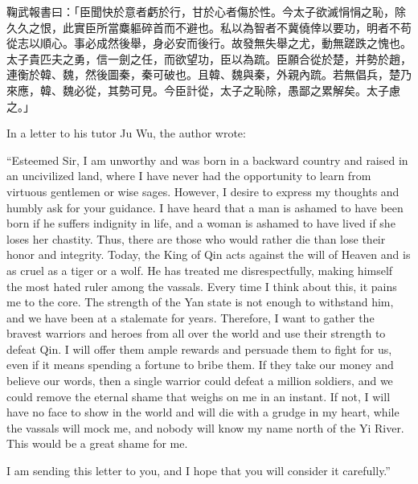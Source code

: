 \documentclass[12pt]{book}
\begin{document}
\Columns
\begin{pairs}
\begin{Rightside}
\begin{chinese}
\beginnumbering
\pstart
鞠武報書曰：「臣聞快於意者虧於行，甘於心者傷於性。今太子欲滅悁悁之恥，除久久之恨，此實臣所當麋軀碎首而不避也。私以為智者不冀僥倖以要功，明者不苟從志以順心。事必成然後舉，身必安而後行。故發無失舉之尤，動無蹉跌之愧也。太子貴匹夫之勇，信一劍之任，而欲望功，臣以為䟽。臣願合從於楚，并勢於趙，連衡於韓、魏，然後圖秦，秦可破也。且韓、魏與秦，外親內䟽。若無倡兵，楚乃來應，韓、魏必從，其勢可見。今臣計從，太子之恥除，愚鄙之累解矣。太子慮之。」
\pend
\endnumbering
\end{chinese}
\end{Rightside}
\begin{Leftside}
\begin{fioesjfsoeifj}
\beginnumbering
\pstart
In a letter to his tutor Ju Wu, the author wrote:

``Esteemed Sir, I am unworthy and was born in a backward country and raised in an uncivilized land, where I have never had the opportunity to learn from virtuous gentlemen or wise sages. However, I desire to express my thoughts and humbly ask for your guidance. I have heard that a man is ashamed to have been born if he suffers indignity in life, and a woman is ashamed to have lived if she loses her chastity. Thus, there are those who would rather die than lose their honor and integrity. Today, the King of Qin acts against the will of Heaven and is as cruel as a tiger or a wolf. He has treated me disrespectfully, making himself the most hated ruler among the vassals. Every time I think about this, it pains me to the core. The strength of the Yan state is not enough to withstand him, and we have been at a stalemate for years. Therefore, I want to gather the bravest warriors and heroes from all over the world and use their strength to defeat Qin. I will offer them ample rewards and persuade them to fight for us, even if it means spending a fortune to bribe them. If they take our money and believe our words, then a single warrior could defeat a million soldiers, and we could remove the eternal shame that weighs on me in an instant. If not, I will have no face to show in the world and will die with a grudge in my heart, while the vassals will mock me, and nobody will know my name north of the Yi River. This would be a great shame for me.

I am sending this letter to you, and I hope that you will consider it carefully.''


\end{fioesjfsoeifj}
\end{Leftside}
\end{pairs}
\end{document}
